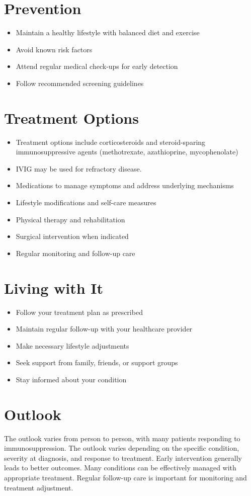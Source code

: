 \section{Prevention}
\begin{itemize}[noitemsep]
  \item Maintain a healthy lifestyle with balanced diet and exercise
  \item Avoid known risk factors
  \item Attend regular medical check-ups for early detection
  \item Follow recommended screening guidelines
\end{itemize}
\section{Treatment Options}
\begin{itemize}[noitemsep]
  \item Treatment options include corticosteroids and steroid-sparing immunosuppressive agents (methotrexate, azathioprine, mycophenolate)
  \item IVIG may be used for refractory disease.
  \item Medications to manage symptoms and address underlying mechanisms
  \item Lifestyle modifications and self-care measures
  \item Physical therapy and rehabilitation
  \item Surgical intervention when indicated
  \item Regular monitoring and follow-up care
\end{itemize}
\section{Living with It}
\begin{itemize}[noitemsep]
  \item Follow your treatment plan as prescribed
  \item Maintain regular follow-up with your healthcare provider
  \item Make necessary lifestyle adjustments
  \item Seek support from family, friends, or support groups
  \item Stay informed about your condition
\end{itemize}
\section{Outlook}
The outlook varies from person to person, with many patients responding to immunosuppression. The outlook varies depending on the specific condition, severity at diagnosis, and response to treatment. Early intervention generally leads to better outcomes. Many conditions can be effectively managed with appropriate treatment. Regular follow-up care is important for monitoring and treatment adjustment.

